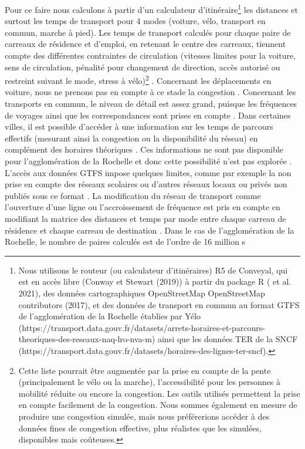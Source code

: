 \documentclass[
  10pt,
  a4paper,
  numbers=noendperiod,
  DIV=12]{scrartcl}
\begin{document}
Pour ce faire nous calculons à partir d'un calculateur
d'itinéraire\footnote{Nous utilisons le routeur (ou calculateur
  d'itinéraires) R5 de Conveyal, qui est en accès libre (Conway et
  Stewart (2019)) à partir du package R ( et al. 2021), des données
  cartographiques OpenStreetMap OpenStreetMap contributors (2017), et
  des données de transport en commun au format GTFS de l'agglomération
  de la Rochelle établies par Yélo
  (https://transport.data.gouv.fr/datasets/arrets-horaires-et-parcours-theoriques-des-reseaux-naq-lro-nva-m)
  ainsi que les données TER de la SNCF
  (https://transport.data.gouv.fr/datasets/horaires-des-lignes-ter-sncf).}
les distances et surtout les temps de transport pour 4 modes (voiture,
vélo, transport en commun, marche à pied). Les temps de transport
calculés pour chaque paire de carreaux de résidence et d'emploi, en
retenant le centre des carreaux, tiennent compte des différentes
contraintes de circulation (vitesses limites pour la voiture, sens de
circulation, pénalité pour changement de direction, accès autorisé ou
restreint suivant le mode, stress à vélo)\footnote{Cette liste pourrait
  être augmentée par la prise en compte de la pente (principalement le
  vélo ou la marche), l'accessibilité pour les personnes à mobilité
  réduite ou encore la congestion. Les outils utilisés permettent la
  prise en compte facilement de la congestion. Nous sommes également en
  mesure de produire une congestion simulée, mais nous préférerions
  accéder à des données fines de congestion effective, plus réalistes
  que les simulées, disponibles mais coûteuses.} . Concernant les
déplacements en voiture, nous ne prenons pas en compte à ce stade la
congestion . Concernant les transports en commun, le niveau de détail
est assez grand, puisque les fréquences de voyages ainsi que les
correspondances sont prises en compte . Dans certaines villes, il est
possible d'accéder à une information sur les temps de parcours effectifs
(mesurant ainsi la congestion ou la disponibilité du réseau) en
complément des horaires théoriques . Ces informations ne sont pas
disponible pour l'agglomération de la Rochelle et donc cette possibilité
n'est pas explorée . L'accès aux données GTFS impose quelques limites,
comme par exemple la non prise en compte des réseaux scolaires ou
d'autres réseaux locaux ou privés non publiés sous ce format . La
modification du réseau de transport comme l'ouverture d'une ligne ou
l'accroissement de fréquence est pris en compte en modifiant la matrice
des distances et temps par mode entre chaque carreau de résidence et
chaque carreau de destination . Dans le cas de l'agglomération de la
Rochelle, le nombre de paires calculés est de l'ordre de 16 million s
\end{document}
